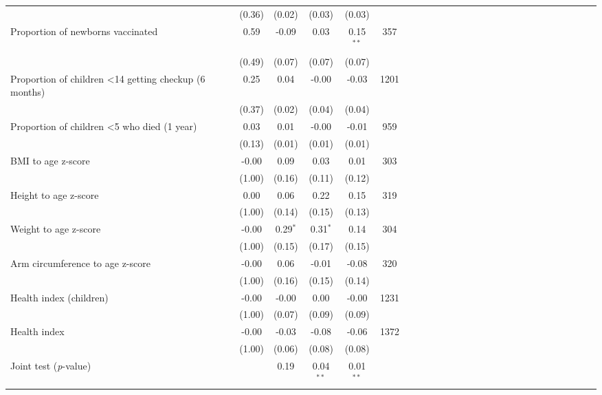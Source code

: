 {\begin{tabular}{l*{5}{SSSSc}}
          &   (0.36)&   (0.02)&   (0.03)&   (0.03)&         \\
Proportion of newborns vaccinated&     0.59&    -0.09&     0.03&0.15$^{**}$&      357\\
          &   (0.49)&   (0.07)&   (0.07)&   (0.07)&         \\
Proportion of children <14 getting checkup (6 months)&     0.25&     0.04&    -0.00&    -0.03&     1201\\
          &   (0.37)&   (0.02)&   (0.04)&   (0.04)&         \\
Proportion of children <5 who died (1 year)&     0.03&     0.01&    -0.00&    -0.01&      959\\
          &   (0.13)&   (0.01)&   (0.01)&   (0.01)&         \\
BMI to age z-score&    -0.00&     0.09&     0.03&     0.01&      303\\
          &   (1.00)&   (0.16)&   (0.11)&   (0.12)&         \\
Height to age z-score&     0.00&     0.06&     0.22&     0.15&      319\\
          &   (1.00)&   (0.14)&   (0.15)&   (0.13)&         \\
Weight to age z-score&    -0.00&0.29$^{*}$&0.31$^{*}$&     0.14&      304\\
          &   (1.00)&   (0.15)&   (0.17)&   (0.15)&         \\
Arm circumference to age z-score&    -0.00&     0.06&    -0.01&    -0.08&      320\\
          &   (1.00)&   (0.16)&   (0.15)&   (0.14)&         \\
Health index (children)&    -0.00&    -0.00&     0.00&    -0.00&     1231\\
          &   (1.00)&   (0.07)&   (0.09)&   (0.09)&         \\
Health index&    -0.00&    -0.03&    -0.08&    -0.06&     1372\\
          &   (1.00)&   (0.06)&   (0.08)&   (0.08)&         \\
\midrule Joint test (\emph{p}-value)&         &   {0.19}&{0.04$^{**}$}&{0.01$^{**}$}&         \\
\bottomrule
\end{tabular}
}
